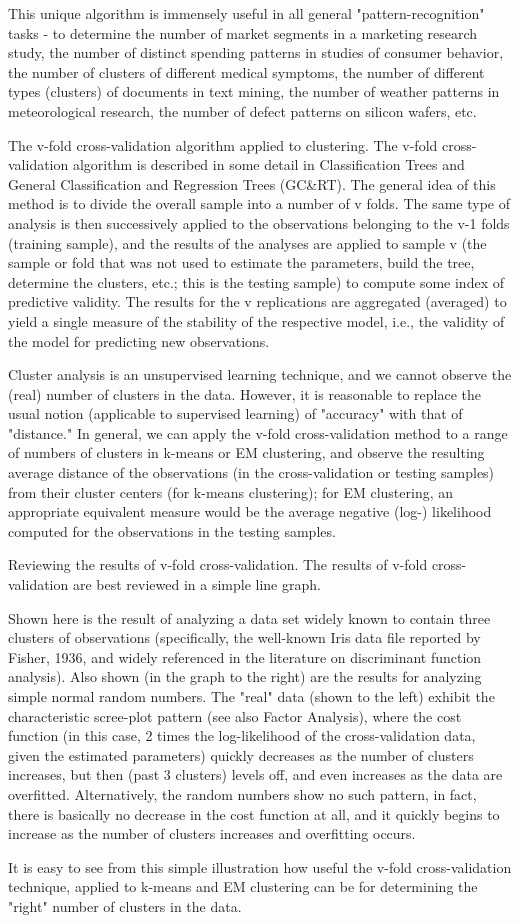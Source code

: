 This unique algorithm is immensely useful in all general "pattern-recognition" tasks - to determine the number of market segments in a marketing research study, the number of distinct spending patterns in studies of consumer behavior, the number of clusters of different medical symptoms, the number of different types (clusters) of documents in text mining, the number of weather patterns in meteorological research, the number of defect patterns on silicon wafers, etc.

The v-fold cross-validation algorithm applied to clustering. The v-fold cross-validation algorithm is described in some detail in Classification Trees and General Classification and Regression Trees (GC&RT). The general idea of this method is to divide the overall sample into a number of v folds. The same type of analysis is then successively applied to the observations belonging to the v-1 folds (training sample), and the results of the analyses are applied to sample v (the sample or fold that was not used to estimate the parameters, build the tree, determine the clusters, etc.; this is the testing sample) to compute some index of predictive validity. The results for the v replications are aggregated (averaged) to yield a single measure of the stability of the respective model, i.e., the validity of the model for predicting new observations.

Cluster analysis is an unsupervised learning technique, and we cannot observe the (real) number of clusters in the data. However, it is reasonable to replace the usual notion (applicable to supervised learning) of "accuracy" with that of "distance." In general, we can apply the v-fold cross-validation method to a range of numbers of clusters in k-means or EM clustering, and observe the resulting average distance of the observations (in the cross-validation or testing samples) from their cluster centers (for k-means clustering); for EM clustering, an appropriate equivalent measure would be the average negative (log-) likelihood computed for the observations in the testing samples.

Reviewing the results of v-fold cross-validation. The results of v-fold cross-validation are best reviewed in a simple line graph.



Shown here is the result of analyzing a data set widely known to contain three clusters of observations (specifically, the well-known Iris data file reported by Fisher, 1936, and widely referenced in the literature on discriminant function analysis). Also shown (in the graph to the right) are the results for analyzing simple normal random numbers. The "real" data (shown to the left) exhibit the characteristic scree-plot pattern (see also Factor Analysis), where the cost function (in this case, 2 times the log-likelihood of the cross-validation data, given the estimated parameters) quickly decreases as the number of clusters increases, but then (past 3 clusters) levels off, and even increases as the data are overfitted. Alternatively, the random numbers show no such pattern, in fact, there is basically no decrease in the cost function at all, and it quickly begins to increase as the number of clusters increases and overfitting occurs.

It is easy to see from this simple illustration how useful the v-fold cross-validation technique, applied to k-means and EM clustering can be for determining the "right" number of clusters in the data.

